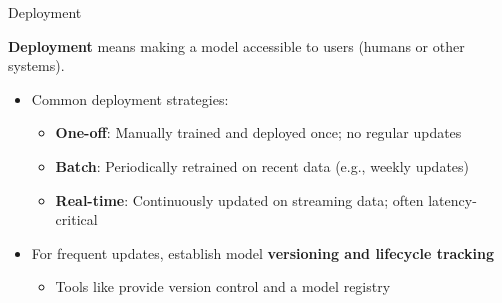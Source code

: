 \documentclass[10pt,compress,t,notes=noshow, xcolor=table]{beamer}
\begin{document}


\begin{frame}{Deployment}
\label{deployment}

\textbf{Deployment} means making a model accessible to users (humans or other systems).

\vspace{0.5em}
\begin{itemize}
  \item Common deployment strategies:
    \begin{itemize}
      \item \textbf{One-off}: Manually trained and deployed once; no regular updates
      \item \textbf{Batch}: Periodically retrained on recent data (e.g., weekly updates)
      \item \textbf{Real-time}: Continuously updated on streaming data; often latency-critical
    \end{itemize}
  \item For frequent updates, establish model \textbf{versioning and lifecycle tracking}
    \begin{itemize}
      \item Tools like  provide version control and a model registry
    \end{itemize}
\end{itemize}
\end{frame}
\end{document}

